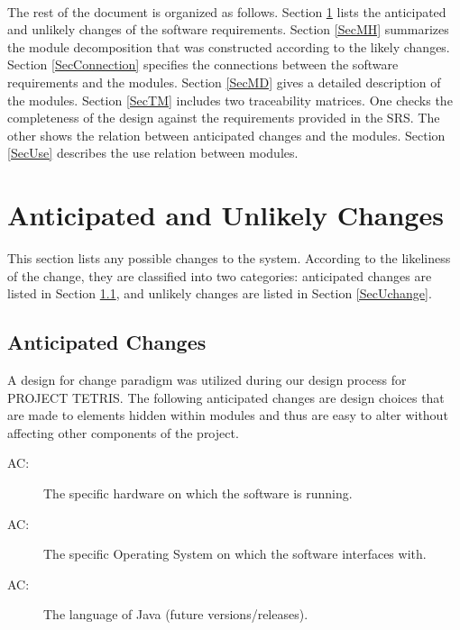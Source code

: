 \documentclass[12pt, titlepage]{article}
\newcounter{acnum}
\newcommand{\actheacnum}{AC\theacnum}
\begin{document}
\paragraph{}
	The rest of the document is organized as follows. Section
\ref{SecChange} lists the anticipated and unlikely changes of the software
requirements. Section \ref{SecMH} summarizes the module decomposition that
was constructed according to the likely changes. Section \ref{SecConnection}
specifies the connections between the software requirements and the
modules. Section \ref{SecMD} gives a detailed description of the
modules. Section \ref{SecTM} includes two traceability matrices. One checks
the completeness of the design against the requirements provided in the SRS. The
other shows the relation between anticipated changes and the modules. Section
\ref{SecUse} describes the use relation between modules.


\section{Anticipated and Unlikely Changes} \label{SecChange}
This section lists any possible changes to the system. According to the likeliness
of the change, they are classified into two
categories: anticipated changes are listed in Section \ref{SecAchange}, and
unlikely changes are listed in Section \ref{SecUchange}.
\subsection{Anticipated Changes} \label{SecAchange}
A design for change paradigm was utilized during our design process for PROJECT TETRIS.
The following anticipated changes are design choices that are made to elements hidden within 
modules and thus are easy to alter without affecting other components of the project.
\begin{description}
\item[ \actheacnum \label{acHardware}:] The specific
  hardware on which the software is running.
\item[ \actheacnum \label{acOS}:] The specific
  Operating System on which the software interfaces with.
\item[ \actheacnum \label{acJava}:] The language
  of Java (future versions/releases).
\end{description}
\end{document}

